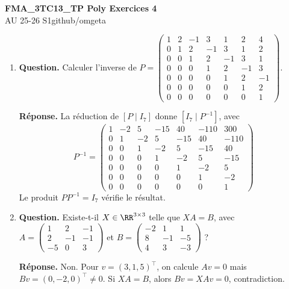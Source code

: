 \documentclass[12pt, a4paper]{article}
\newcommand{\mytitle}{FMA\_3TC13\_TP Poly Exercices 4}
\newcommand{\myauthor}{github/omgeta}
\newcommand{\mydate}{AU 25-26 S1}
\begin{document}
\raggedright
\footnotesize
\begin{center}
{\normalsize{\textbf{\mytitle}}} \\
{\footnotesize{\mydate\hspace{2pt}\textemdash\hspace{2pt}\myauthor}}
\end{center}
\begin{enumerate}[label=4.\arabic*., start=60]

  \item \begin{minipage}[t]{\linewidth}\raggedright
\textbf{Question.} Calculer l’inverse de $\displaystyle P=\begin{pmatrix}1&2&-1&3&1&2&4\\0&1&2&-1&3&1&2\\0&0&1&2&-1&3&1\\0&0&0&1&2&-1&3\\0&0&0&0&1&2&-1\\0&0&0&0&0&1&2\\0&0&0&0&0&0&1\end{pmatrix}$.
\par\smallskip
\textbf{Réponse.} La réduction de $[P\mid I_7]$ donne $[I_7\mid P^{-1}]$, avec
    \[
      P^{-1}=\begin{pmatrix}
        1&-2&5&-15&40&-110&300\\
        0&1&-2&5&-15&40&-110\\
        0&0&1&-2&5&-15&40\\
        0&0&0&1&-2&5&-15\\
        0&0&0&0&1&-2&5\\
        0&0&0&0&0&1&-2\\
        0&0&0&0&0&0&1
      \end{pmatrix}
    \]
    Le produit $PP^{-1}=I_7$ vérifie le résultat.
\end{minipage}

  \item \begin{minipage}[t]{\linewidth}\raggedright
\textbf{Question.} Existe-t-il $X\in\RR^{3\times3}$ telle que $XA=B$, avec $\displaystyle A=\begin{pmatrix}1&2&-1\\2&-1&-1\\-5&0&3\end{pmatrix}$ et $\displaystyle B=\begin{pmatrix}-2&1&1\\8&-1&-5\\4&3&-3\end{pmatrix}$ ?
\par\smallskip
\textbf{Réponse.} Non. Pour $v=(3,1,5)^\top$, on calcule $Av=0$ mais $Bv=(0,-2,0)^\top\neq0$.
    Si $XA=B$, alors $Bv=XAv=0$, contradiction.
\end{minipage}


\end{enumerate}
\end{document}
